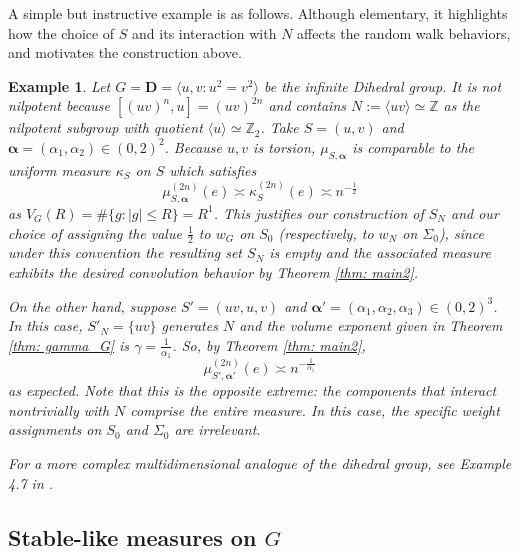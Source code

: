 \documentclass[pdflatex,sn-mathphys-num]{sn-jnl}%
\theoremstyle{thmstyleone}%
\theoremstyle{thmstyletwo}%
\newtheorem{exa}{Example}%
\theoremstyle{thmstylethree}%
\begin{document}
A simple but instructive example is as follows. Although elementary, it highlights how the choice of $S$ and its interaction with $N$ affects the random walk behaviors, and motivates the construction above. 
\begin{exa}
Let $G = \mathbf{D} =  \langle u, v : u^2 = v^2\rangle$ be the infinite Dihedral group. It is not nilpotent because $[(uv)^n, u] = (uv)^{2n}$ and contains $N:= \langle uv \rangle \simeq \mathbb{Z}$ as the nilpotent subgroup with quotient $\langle u\rangle\simeq \mathbb{Z}_2$. 
Take $S = (u, v)$ and $\bm{\alpha} = (\alpha_1, \alpha_2) \in (0,2)^2$.  Because $u,v$ is torsion, $\mu_{S,\bm{\alpha}}$ is comparable to the uniform measure $\kappa_S$ on $S$ which satisfies
$$\mu_{S,\bm{\alpha}}^{(2n)}(e) \asymp \kappa_S^{(2n)}(e)\asymp 
n^{-\frac{1}{2}}$$
as $V_G(R) = \# \{g: |g| \le R\} = R^1$. 
This justifies 
our construction of $S_N$ and our choice of 
assigning the value $\frac{1}{2}$ to $w_G$ on $S_0$ (respectively, to $w_N$ on $\Sigma_0$), since under this convention the resulting set $S_N$ is empty and the associated measure exhibits the desired convolution behavior by Theorem \ref{thm: main2}. 

On the other hand, 
suppose $S' = (uv, u,v)$ and $\bm{\alpha}' = (\alpha_1,\alpha_2,\alpha_3) \in (0,2)^3$. In this case,  $S'_N = \{uv\}$ generates $N$ and the volume exponent given in Theorem \ref{thm: gamma_G} is $\gamma = \frac{1}{\alpha_1}$. So, by Theorem \ref{thm: main2}, 
$$\mu_{S',\bm{\alpha}'}^{(2n)}(e) \asymp  n^{-\frac{1}{\alpha_1}}$$
as expected. Note that this is the opposite extreme: the components that interact nontrivially with $N$ comprise the entire measure. In this case, the specific weight assignments on $S_0$ and $\Sigma_0$ are irrelevant.

For a more complex multidimensional analogue of the dihedral group, see Example 4.7 in \cite{CKSCWZ}.
\end{exa}


\subsection{Stable-like measures on $G$}
\end{document}
